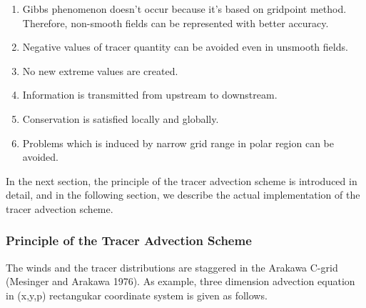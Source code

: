 \begin{enumerate}
\def\labelenumi{\arabic{enumi}.}
\item
  Gibbs phenomenon doesn't occur because it's based on gridpoint method. Therefore, non-smooth fields can be represented with better accuracy.
\item
  Negative values of tracer quantity can be avoided even in unsmooth fields.
\item
  No new extreme values are created.
\item
  Information is transmitted from upstream to downstream.
\item
  Conservation is satisfied locally and globally.
\item
  Problems which is induced by narrow grid range in polar region can be avoided.
\end{enumerate}

In the next section, the principle of the tracer advection scheme is introduced in detail, and in the following section, we describe the actual implementation of the tracer advection scheme.

\hypertarget{principle-of-the-tracer-advection-scheme}{%
\subsubsection{Principle of the Tracer Advection Scheme}\label{principle-of-the-tracer-advection-scheme}}

The winds and the tracer distributions are staggered in the Arakawa C-grid (Mesinger and Arakawa 1976). As example, three dimension advection equation in (x,y,p) rectangukar coordinate system is given
as follows.

